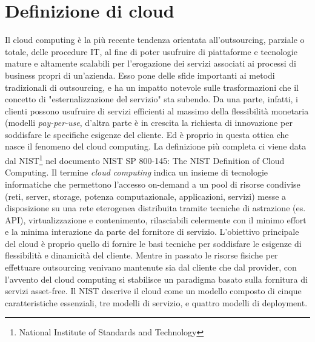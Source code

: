 \section{Definizione di cloud}
Il cloud computing è la più recente tendenza orientata all'outsourcing, parziale o totale, delle procedure IT, al fine di poter usufruire di piattaforme e tecnologie mature e altamente scalabili per l'erogazione dei servizi associati ai processi di business propri di un'azienda.
Esso pone delle sfide importanti ai metodi tradizionali di outsourcing, e ha un impatto notevole sulle trasformazioni che il concetto di "esternalizzazione del servizio" sta subendo.\cite{OutsourcingCloud}
Da una parte, infatti, i clienti possono usufruire di servizi efficienti al massimo della flessibilità monetaria (modelli \textit{pay-per-use}, d'altra parte è in crescita la richiesta di innovazione per soddisfare le specifiche esigenze del cliente.\cite{OutsourcingCloud2}
Ed è proprio in questa ottica che nasce il fenomeno del cloud computing.
La definizione più completa ci viene data dal NIST\footnote{National Institute of Standards and Technology} nel documento NIST SP 800-145: The NIST Definition of Cloud Computing\cite{NISTCloud}.
Il termine \textit{cloud computing} indica un insieme di tecnologie informatiche che permettono l'accesso on-demand a un pool di risorse condivise (reti, server, storage, potenza computazionale, applicazioni, servizi) messe a disposizione su una rete eterogenea distribuita tramite tecniche di astrazione (es. API), virtualizzazione e contenimento, rilasciabili celermente con il minimo effort e la minima interazione da parte del fornitore di servizio.
L'obiettivo principale del cloud è proprio quello di fornire le basi tecniche per soddisfare le esigenze di flessibilità e dinamicità del cliente.
Mentre in passato le risorse fisiche per effettuare outsourcing venivano mantenute sia dal cliente che dal provider, con l'avvento del cloud computing si stabilisce un paradigma basato sulla fornitura di servizi asset-free.\cite{OutsourcingCloud2}
Il NIST\cite{NISTCloud} descrive il cloud come un modello composto di cinque caratteristiche essenziali, tre modelli di servizio, e quattro modelli di deployment.
